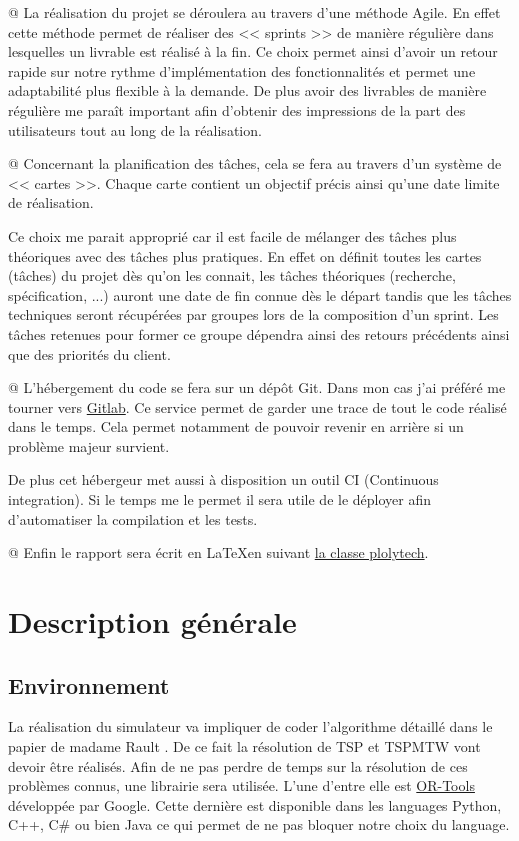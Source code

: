 \documentclass[noposter]{polytech}
\begin{document}
		\begin{easylist}
			@ La réalisation du projet se déroulera au travers d'une méthode Agile.
			En effet cette méthode permet de réaliser des << sprints >> de manière régulière dans lesquelles un livrable est réalisé à la fin.
			Ce choix permet ainsi d'avoir un retour rapide sur notre rythme d'implémentation des fonctionnalités et permet une adaptabilité plus flexible à la demande.
			De plus avoir des livrables de manière régulière me paraît important afin d'obtenir des impressions de la part des utilisateurs tout au long de la réalisation.
			
			@ Concernant la planification des tâches, cela se fera au travers d'un système de << cartes >>.
			Chaque carte contient un objectif précis ainsi qu'une date limite de réalisation.
			
			Ce choix me parait approprié car il est facile de mélanger des tâches plus théoriques avec des tâches plus pratiques.
			En effet on définit toutes les cartes (tâches) du projet dès qu'on les connait, les tâches théoriques (recherche, spécification, ...) auront une date de fin connue dès le départ tandis que les tâches techniques seront récupérées par groupes lors de la composition d'un sprint.
			Les tâches retenues pour former ce groupe dépendra ainsi des retours précédents ainsi que des priorités du client.
			
			@ L'hébergement du code se fera sur un dépôt Git.
			Dans mon cas j'ai préféré me tourner vers \href{https://gitlab.com}{Gitlab}.
			Ce service permet de garder une trace de tout le code réalisé dans le temps.
			Cela permet notamment de pouvoir revenir en arrière si un problème majeur survient.
			
			De plus cet hébergeur met aussi à disposition un outil CI (Continuous integration).
			Si le temps me le permet il sera utile de le déployer afin d'automatiser la compilation et les tests.
			
			@ Enfin le rapport sera écrit en \LaTeX en suivant \href{https://gitlab.projectsforge.org/polytech/polytech/}{la classe plolytech}.
		\end{easylist}
			
\chapter{Description générale}
	\section{Environnement}
		La réalisation du simulateur va impliquer de coder l'algorithme détaillé dans le papier de madame Rault \cite{Rault:chargers}.
		De ce fait la résolution de TSP et TSPMTW vont devoir être réalisés.
		Afin de ne pas perdre de temps sur la résolution de ces problèmes connus, une librairie sera utilisée.
		L'une d'entre elle est \href{https://developers.google.com/optimization/}{OR-Tools} développée par Google.
		Cette dernière est disponible dans les languages Python, C++, C\# ou bien Java ce qui permet de ne pas bloquer notre choix du language.
		
\end{document}
